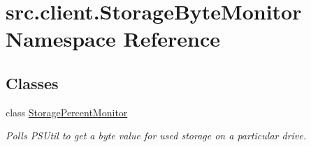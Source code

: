 \hypertarget{namespacesrc_1_1client_1_1_storage_byte_monitor}{\section{src.\-client.\-Storage\-Byte\-Monitor Namespace Reference}
\label{namespacesrc_1_1client_1_1_storage_byte_monitor}
}
\subsection*{Classes}
\begin{DoxyCompactItemize}
\item 
class \hyperlink{classsrc_1_1client_1_1_storage_byte_monitor_1_1_storage_percent_monitor}{Storage\-Percent\-Monitor}
\begin{DoxyCompactList}\small\item\em Polls P\-S\-Util to get a byte value for used storage on a particular drive. \end{DoxyCompactList}\end{DoxyCompactItemize}
